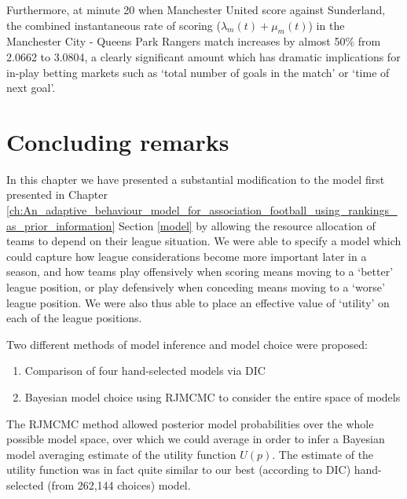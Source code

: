 Furthermore, at minute 20 when Manchester United score against Sunderland, the combined instantaneous rate of scoring
(\(\lambda_m(t) + \mu_m(t)\)) in the Manchester City - Queens Park Rangers match increases by almost 50\% from 2.0662
to 3.0804, a clearly significant amount which has dramatic implications for in-play betting markets such as `total number
of goals in the match' or `time of next goal'.

\section{Concluding remarks}
\label{sec:Concluding_remarks_utility}
 
In this chapter we have presented a substantial modification to the model first presented in Chapter
\ref{ch:An_adaptive_behaviour_model_for_association_football_using_rankings_as_prior_information} Section \ref{model} by
allowing the resource allocation of teams to depend on their league situation. We were able to specify a model which
could capture how league considerations become more important later in a season, and how teams play offensively when
scoring means moving to a `better' league position, or play defensively when conceding means moving to a `worse' league
position. We were also thus able to place an effective value of `utility' on each of the league positions.

Two different methods of model inference and model choice were proposed:
\begin{enumerate} 
  \item Comparison of four hand-selected models via \gls{DIC}
  \item Bayesian model choice using \gls{RJMCMC} to consider the entire space of models
\end{enumerate}
The \gls{RJMCMC} method allowed posterior model probabilities over the whole possible model space, over which we could
average in order to infer a Bayesian model averaging estimate of the utility function \(U(p)\). The estimate of the
utility function was in fact quite similar to our best (according to \gls{DIC}) hand-selected (from 262,144 choices)
model.



